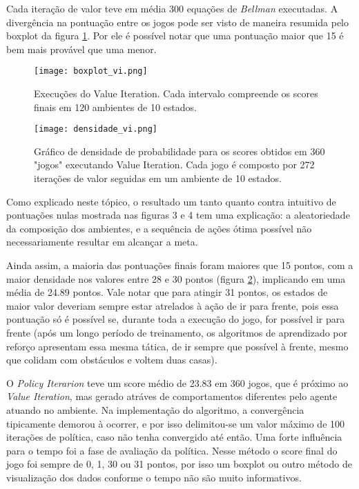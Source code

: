 \documentclass[letterpaper]{article} %
\begin{document}
Cada iteração de valor teve em média 300 equações de \textit{Bellman} executadas. A divergência na pontuação entre os jogos pode ser visto de maneira resumida pelo boxplot da figura \ref{fig:boxplot_vi}. Por ele é possível notar que uma pontuação maior que 15 é bem mais provável que uma menor.

\begin{figure}[h]
	\center
	\texttt{[image: boxplot\_vi.png]}
    \caption{Execuções do Value Iteration. Cada intervalo compreende os scores finais em 120 ambientes de 10 estados.}
    \label{fig:boxplot_vi}
\end{figure}

\begin{figure}[h]
	\center
	\texttt{[image: densidade\_vi.png]}
    \caption{Gráfico de densidade de probabilidade para os scores obtidos em 360 "jogos" executando Value Iteration. Cada jogo é composto por 272 iterações de valor seguidas em um ambiente de 10 estados.}
    \label{fig:densidade_vi}
\end{figure}


Como explicado neste tópico, o resultado um tanto quanto contra intuitivo de pontuações nulas mostrada nas figuras 3 e 4 tem uma explicação: a aleatoriedade da composição dos ambientes, e a sequência de ações ótima possível não necessariamente resultar em alcançar a meta.

Ainda assim, a maioria das pontuações finais foram maiores que 15 pontos, com a maior densidade nos valores entre 28 e 30 pontos (figura \ref{fig:densidade_vi}), implicando em uma média de 24.89 pontos. Vale notar que para atingir 31 pontos, os estados de maior valor deveriam sempre estar atrelados à ação de ir para frente, pois essa pontuação só é possível se, durante toda a execução do jogo, for possível ir para frente (após um longo período de treinamento, os algoritmos de aprendizado por reforço apresentam essa mesma tática, de ir sempre que possível à frente, mesmo que colidam com obstáculos e voltem duas casas).


O \textit{Policy Iterarion} teve um score médio de 23.83 em 360 jogos, que é próximo ao \textit{Value Iteration}, mas gerado atráves de comportamentos diferentes pelo agente atuando no ambiente. Na implementação do algoritmo, a convergência tipicamente demorou à ocorrer, e por isso delimitou-se um valor máximo de 100 iterações de política, caso não tenha convergido até então. Uma forte influência para o tempo foi a fase de avaliação da política. Nesse método o score final do jogo foi sempre de 0, 1, 30 ou 31 pontos, por isso um boxplot ou outro método de visualização dos dados conforme o tempo não são muito informativos.
\end{document}
